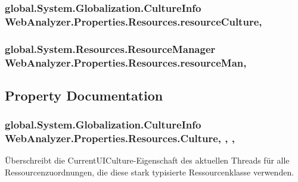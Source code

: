 \subsubsection[{resource\+Culture}]{\setlength{\rightskip}{0pt plus 5cm}global.\+System.\+Globalization.\+Culture\+Info Web\+Analyzer.\+Properties.\+Resources.\+resource\+Culture\hspace{0.3cm}{\ttfamily [static]}, {\ttfamily [private]}}\label{class_web_analyzer_1_1_properties_1_1_resources_aa1f37c676dd6756ca15dd105de9afdf9}
\hypertarget{class_web_analyzer_1_1_properties_1_1_resources_aaebd641d89bb338a94624dd86479a31d}{}
\subsubsection[{resource\+Man}]{\setlength{\rightskip}{0pt plus 5cm}global.\+System.\+Resources.\+Resource\+Manager Web\+Analyzer.\+Properties.\+Resources.\+resource\+Man\hspace{0.3cm}{\ttfamily [static]}, {\ttfamily [private]}}\label{class_web_analyzer_1_1_properties_1_1_resources_aaebd641d89bb338a94624dd86479a31d}


\subsection{Property Documentation}
\hypertarget{class_web_analyzer_1_1_properties_1_1_resources_af4ffabc99956a2a25a06d43705a448ae}{}
\subsubsection[{Culture}]{\setlength{\rightskip}{0pt plus 5cm}global.\+System.\+Globalization.\+Culture\+Info Web\+Analyzer.\+Properties.\+Resources.\+Culture\hspace{0.3cm}{\ttfamily [static]}, {\ttfamily [get]}, {\ttfamily [set]}, {\ttfamily [package]}}\label{class_web_analyzer_1_1_properties_1_1_resources_af4ffabc99956a2a25a06d43705a448ae}


Überschreibt die Current\+U\+I\+Culture-\/\+Eigenschaft des aktuellen Threads für alle Ressourcenzuordnungen, die diese stark typisierte Ressourcenklasse verwenden. 

